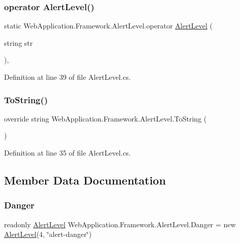 \subsubsection{\texorpdfstring{operator AlertLevel()}{operator AlertLevel()}}
{\footnotesize\ttfamily static Web\+Application.\+Framework.\+Alert\+Level.\+operator \mbox{\hyperlink{classWebApplication_1_1Framework_1_1AlertLevel}{Alert\+Level}} (\begin{DoxyParamCaption}\item[{string}]{str }\end{DoxyParamCaption})\hspace{0.3cm}{\ttfamily [explicit]}, {\ttfamily [static]}}



Definition at line 39 of file Alert\+Level.\+cs.

\mbox{\label{classWebApplication_1_1Framework_1_1AlertLevel_ac61b4db00d547e0117ca241424a8cdca}} 
\subsubsection{\texorpdfstring{ToString()}{ToString()}}
{\footnotesize\ttfamily override string Web\+Application.\+Framework.\+Alert\+Level.\+To\+String (\begin{DoxyParamCaption}{ }\end{DoxyParamCaption})}



Definition at line 35 of file Alert\+Level.\+cs.



\subsection{Member Data Documentation}
\mbox{\label{classWebApplication_1_1Framework_1_1AlertLevel_af252369367ae2302d659ad14d3c08238}} 
\subsubsection{\texorpdfstring{Danger}{Danger}}
{\footnotesize\ttfamily readonly \mbox{\hyperlink{classWebApplication_1_1Framework_1_1AlertLevel}{Alert\+Level}} Web\+Application.\+Framework.\+Alert\+Level.\+Danger = new \mbox{\hyperlink{classWebApplication_1_1Framework_1_1AlertLevel}{Alert\+Level}}(4, \char`\"{}alert-\/danger\char`\"{})\hspace{0.3cm}{\ttfamily [static]}}



